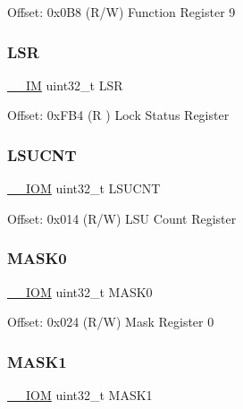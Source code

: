 Offset\+: 0x0\+B8 (R/W) Function Register 9 \mbox{\label{struct_d_w_t___type_a7219432d03f6cd1d220f4fe10aef4880}} 
\subsubsection{\texorpdfstring{L\+SR}{LSR}}
{\footnotesize\ttfamily \mbox{\hyperlink{core__cm4_8h_a4cc1649793116d7c2d8afce7a4ffce43}{\+\_\+\+\_\+\+IM}} uint32\+\_\+t L\+SR}

Offset\+: 0x\+F\+B4 (R ) Lock Status Register \mbox{\label{struct_d_w_t___type_ae886261750c8c90d67a2f276d074e9c3}} 
\subsubsection{\texorpdfstring{L\+S\+U\+C\+NT}{LSUCNT}}
{\footnotesize\ttfamily \mbox{\hyperlink{core__cm4_8h_ab6caba5853a60a17e8e04499b52bf691}{\+\_\+\+\_\+\+I\+OM}} uint32\+\_\+t L\+S\+U\+C\+NT}

Offset\+: 0x014 (R/W) L\+SU Count Register \mbox{\label{struct_d_w_t___type_a84089e08ecf14b86f92c727a568ceac4}} 
\subsubsection{\texorpdfstring{M\+A\+S\+K0}{MASK0}}
{\footnotesize\ttfamily \mbox{\hyperlink{core__cm4_8h_ab6caba5853a60a17e8e04499b52bf691}{\+\_\+\+\_\+\+I\+OM}} uint32\+\_\+t M\+A\+S\+K0}

Offset\+: 0x024 (R/W) Mask Register 0 \mbox{\label{struct_d_w_t___type_a6f663226a4f3409b0a73651b5a90b3af}} 
\subsubsection{\texorpdfstring{M\+A\+S\+K1}{MASK1}}
{\footnotesize\ttfamily \mbox{\hyperlink{core__cm4_8h_ab6caba5853a60a17e8e04499b52bf691}{\+\_\+\+\_\+\+I\+OM}} uint32\+\_\+t M\+A\+S\+K1}

